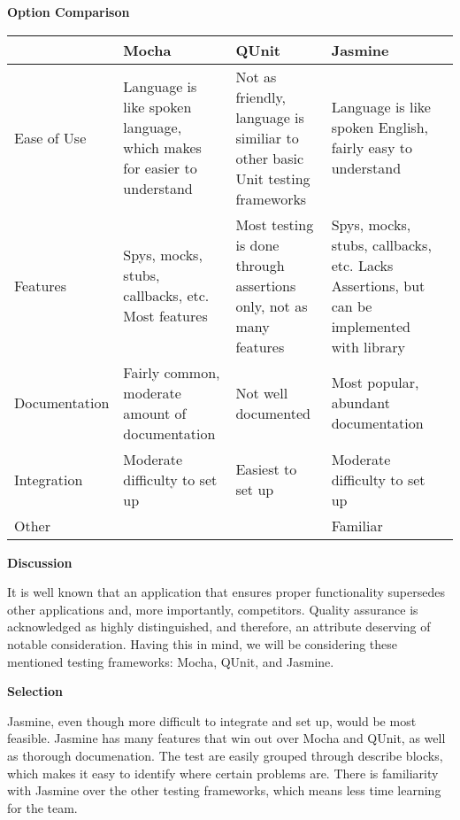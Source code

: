 \documentclass[letterpaper, 10pt, draftclsnofoot, compsoc, onecolumn]{IEEEtran}
\begin{document}
{{ \par}


\newpage
{\noindent\rmfamily\bfseries\color{black} Option Comparison \par}
\tablehead{}
\begin{supertabular}{|p{2cm}|p{2.5cm}|p{2.5cm}|p{2.5cm}|p{2.5cm}|}
\hline 
& Mocha 
& QUnit 
& Jasmine\\ \hline
Ease of Use 
	& Language is like spoken language, which makes for easier to understand 
	& Not as friendly, language is similiar to other basic Unit testing frameworks 	& Language is like spoken English, fairly easy to understand\\ \hline
Features & Spys, mocks, stubs, callbacks, etc. Most features & Most testing is done through assertions only, not as many features & Spys, mocks, stubs, callbacks, etc. Lacks Assertions, but can be implemented with library\\ \hline
Documentation & Fairly common, moderate amount of documentation & Not well documented & Most popular, abundant documentation \\ \hline
Integration & Moderate difficulty to set up & Easiest to set up & Moderate difficulty to set up\\ \hline
Other & & & Familiar\\ \hline
\end{supertabular}

\newpage
{\noindent\rmfamily\bfseries\color{black} Discussion \par}
{\noindent It is well known that an application that ensures proper functionality supersedes other applications and, more importantly, competitors. Quality assurance is acknowledged as highly distinguished, and therefore, an attribute deserving of notable consideration. Having this in mind, we will be considering these mentioned testing frameworks: Mocha, QUnit, and Jasmine. \par}

\medskip
{\noindent\rmfamily\bfseries\color{black} Selection \par}
{\noindent Jasmine, even though more difficult to integrate and set up, would be most feasible. Jasmine has many features that win out over Mocha and QUnit, as well as thorough documenation. The test are easily grouped through describe blocks, which makes it easy to identify where certain problems are. There is familiarity with Jasmine over the other testing frameworks, which means less time learning for the team.\par}

}
\end{document}

